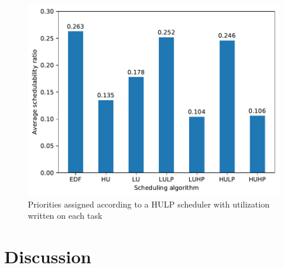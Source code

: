 \documentclass{kththesis}
\begin{document}
\begin{figure}[H]

    \centering

    \includegraphics[width=1.0\linewidth]{images/sched_algos_averages.pdf}

    \caption{Priorities assigned according to a HULP scheduler with utilization written on each task}

    \label{fig:sched_algos_averages}

\end{figure}

\chapter{Discussion} \label{ch:discussion}
\end{document}
